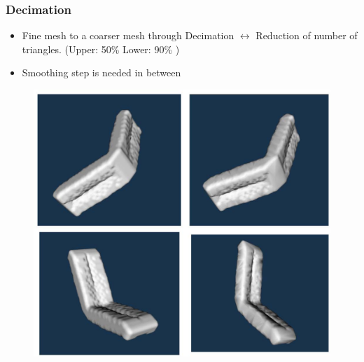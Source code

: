 \begin{frame}

	\frametitle{Decimation}
	\begin{minipage}{0.85\textwidth}
	\begin{itemize}
	\item Fine mesh to a coarser mesh through Decimation $\leftrightarrow$ Reduction of number of triangles. (Upper: 50\% Lower: 90\% )
	\end{itemize}

	\begin{itemize}
	\item Smoothing step is needed in between
	\end{itemize}

	\begin{figure}
	\includegraphics[scale=0.30]{Pictures/Decimation.pdf}


\end{figure}
\end{minipage}
\end{frame}
